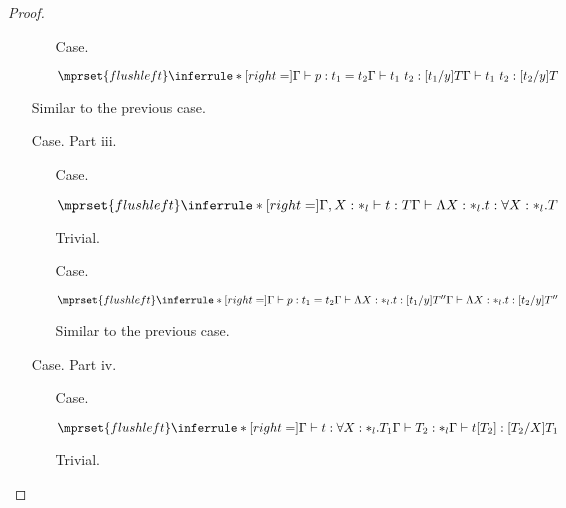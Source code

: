 \begin{proof}
\begin{itemize}
\begin{itemize}
  \item[Case.] \ \\
    \begin{center}
      \begin{math}
        $$\mprset{flushleft}
        \inferrule* [right=] {
          \Gamma \vdash p:t_1 = t_2
          \\
          \Gamma \vdash t_1\ t_2:[t_1/y]T
        }{\Gamma \vdash t_1\ t_2:[t_2/y]T}
      \end{math}
    \end{center}
  \end{itemize}
  Similar to the previous case.

\item[Case.] Part iii.\\
  \begin{itemize}
  \item[Case.] \ \\
    \begin{center}
      \begin{math}
        $$\mprset{flushleft}
        \inferrule* [right=] {
          \Gamma, X : *_l \vdash t : T
        }{\Gamma \vdash \Lambda X:*_l.t:\forall X : *_l.T}
      \end{math}
    \end{center}
    Trivial.
    
  \item[Case.] \ \\
    \begin{center}
      \begin{math}
        $$\mprset{flushleft}
        \inferrule* [right=] {
          \Gamma \vdash p:t_1 = t_2
          \\
          \Gamma \vdash \Lambda X:*_l.t:[t_1/y]T''
        }{\Gamma \vdash \Lambda X:*_l.t:[t_2/y]T''}
      \end{math}
    \end{center}
    Similar to the previous case.
  \end{itemize}
  
\item[Case.] Part iv.\\
  \begin{itemize}
  \item[Case.] \ \\
    \begin{center}
      \begin{math}
        $$\mprset{flushleft}
        \inferrule* [right=] {
          \Gamma \vdash t:\forall X:*_l.T_1
          \\
          \Gamma \vdash T_2:*_l
        }{\Gamma \vdash t[T_2]: [T_2/X]T_1}
      \end{math} 
    \end{center}
    Trivial.


\end{itemize}
\end{itemize}
\end{proof}
